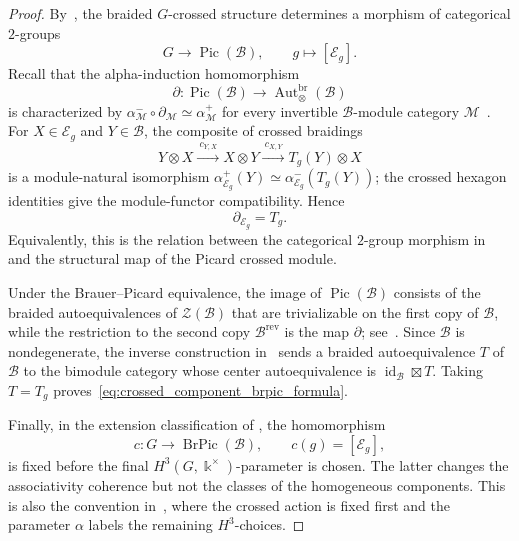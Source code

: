 \documentclass[12pt]{amsart}
\theoremstyle{plain}
\theoremstyle{definition} %
\theoremstyle{remark} %
\newcommand{\ku}{{\Bbbk}} %
\newcommand{\cB}{\mathcal{B}}
\newcommand{\cE}{\mathcal{E}}
\newcommand{\cM}{\mathcal{M}}
\newcommand{\Aut}{\operatorname{Aut}}
\newcommand{\id}{\operatorname{id}}
\begin{document}
\begin{proof}
By~\cite[Theorem~7.12]{ENO10}, the braided $G$-crossed structure determines a
morphism of categorical $2$-groups
\[
G\longrightarrow\operatorname{Pic}(\cB),
\qquad
 g\longmapsto[\cE_g].
\]
Recall that the alpha-induction homomorphism
\[
\partial:\operatorname{Pic}(\cB)
   \longrightarrow\Aut^{\mathrm{br}}_\otimes(\cB)
\]
is characterized by
$\alpha^-_{\cM}\circ\partial_{\cM}\simeq\alpha^+_{\cM}$ for every
invertible $\cB$-module category $\cM$~\cite[Section~5.4]{ENO10}.
For $X\in\cE_g$ and $Y\in\cB$, the composite of crossed braidings
\[
Y\otimes X
\xrightarrow{\ c_{Y,X}\ }
X\otimes Y
\xrightarrow{\ c_{X,Y}\ }
T_g(Y)\otimes X
\]
is a module-natural isomorphism
$\alpha^+_{\cE_g}(Y)\simeq\alpha^-_{\cE_g}(T_g(Y))$; the crossed hexagon
identities give the module-functor compatibility.  Hence
\[
\partial_{\cE_g}=T_g.
\]
Equivalently, this is the relation between the categorical $2$-group morphism
in~\cite[Theorem~7.12]{ENO10} and the structural map of the Picard crossed
module.

Under the Brauer--Picard equivalence, the image of
$\operatorname{Pic}(\cB)$ consists of the braided autoequivalences of
$\mathcal Z(\cB)$ that are trivializable on the first copy of $\cB$, while the
restriction to the second copy $\cB^{\mathrm{rev}}$ is the map $\partial$;
see~\cite[Lemma~4.4 and Corollary~4.9]{DN13}.  Since $\cB$ is
nondegenerate, the inverse construction in~\cite[Theorem~5.2]{ENO10} sends a
braided autoequivalence $T$ of $\cB$ to the bimodule category whose center
autoequivalence is $\id_{\cB}\boxtimes T$.  Taking $T=T_g$ proves~\eqref{eq:crossed_component_brpic_formula}.

Finally, in the extension classification of
\cite[Theorems~1.3 and~8.9]{ENO10}, the homomorphism
\[
c:G\longrightarrow\operatorname{BrPic}(\cB),
\qquad c(g)=[\cE_g],
\]
is fixed before the final $H^3(G,\ku^\times)$-parameter is chosen.  The latter
changes the associativity coherence but not the classes of the homogeneous
components.  This is also the convention in~\cite[Definition~2.1]{GPR24},
where the crossed action is fixed first and the parameter $\alpha$ labels the
remaining $H^3$-choices.
\end{proof}
\end{document}
